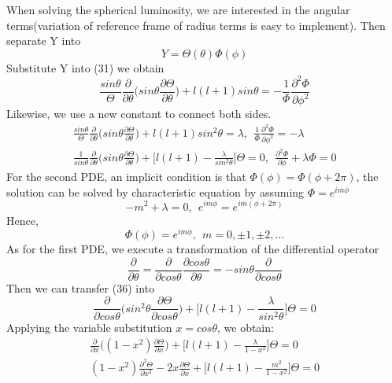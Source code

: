 \documentclass[25pt]{article}
\begin{document}
When solving the spherical luminosity, we are interested in the angular terms(variation of reference frame of radius terms is easy to implement). Then separate Y into
\begin{equation}
    Y = \Theta(\theta)\Phi(\phi)
\end{equation}
Substitute Y into (31) we obtain
\begin{equation}
    \frac{sin \theta}{\Theta } \frac{\partial}{\partial \theta}\bigg(sin \theta \frac{\partial \Theta}{\partial \theta}\bigg)  + l(l+1)sin \theta = -\frac{1}{\Phi } \frac{\partial^2 \Phi}{\partial \phi^2}
\end{equation}
Likewise, we use a new constant to connect both sides.
\begin{gather}
    \frac{sin \theta}{\Theta } \frac{\partial}{\partial \theta}\bigg(sin \theta \frac{\partial \Theta}{\partial \theta}\bigg)  + l(l+1)sin^2 \theta = \lambda,~~\frac{1}{\Phi } \frac{\partial^2 \Phi}{\partial \phi^2} = -\lambda \\
    \frac{1}{sin \theta} \frac{\partial}{\partial \theta}\bigg(sin \theta \frac{\partial \Theta}{\partial \theta}\bigg) + \bigg[l(l+1) - \frac{\lambda}{sin^2 \theta} \bigg]\Theta = 0, ~~\frac{\partial^2 \Phi}{\partial \phi} + \lambda \Phi = 0
\end{gather}
For the second PDE, an implicit condition is that $\Phi(\phi ) =\Phi(\phi + 2\pi)$, the solution can be solved by characteristic equation by assuming $\Phi = e^{i m \phi}$
\begin{equation}
    -m^2 + \lambda = 0,~~e^{im \phi} = e^{im (\phi + 2\pi)}
\end{equation}
Hence, 
\begin{equation}
    \Phi(\phi) = e^{im\phi},~~m = 0, \pm1, \pm2,\dots
\end{equation}
As for the first PDE, we execute a transformation of the differential operator
\begin{equation}
    \frac{\partial}{\partial \theta} = \frac{\partial}{\partial cos \theta} \frac{\partial cos \theta}{\partial \theta} = -sin\theta \frac{\partial}{\partial cos \theta}
\end{equation}
Then we can transfer (36) into
\begin{equation}
    \frac{\partial}{\partial cos \theta}\bigg( sin^2 \theta \frac{\partial \Theta}{\partial cos \theta}\bigg) + \bigg[l(l+1) - \frac{\lambda}{sin^2 \theta}\bigg]\Theta = 0
\end{equation} 
Applying the variable substitution $x = cos\theta$, we obtain:
\begin{gather}
    \frac{\partial}{\partial x}\bigg((1-x^2)\frac{\partial \Theta}{\partial x}\bigg) + \bigg[l(l+1) - \frac{\lambda}{1-x^2} \bigg] \Theta = 0 \\
    (1-x^2)\frac{\partial^2 \Theta}{\partial x^2} -2x\frac{\partial \Theta}{\partial x} + \bigg[l(l+1) - \frac{m^2}{1-x^2}\bigg]\Theta = 0
\end{gather}
\end{document}
